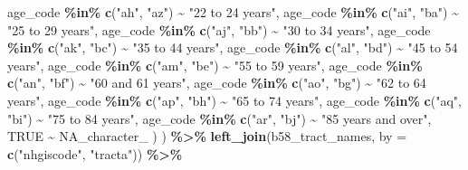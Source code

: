 \documentclass[
]{article}
\newenvironment{Shaded}{\begin{snugshade}}{\end{snugshade}}
\newcommand{\AttributeTok}[1]{\textcolor[rgb]{0.13,0.29,0.53}{#1}}
\newcommand{\ConstantTok}[1]{\textcolor[rgb]{0.56,0.35,0.01}{#1}}
\newcommand{\FunctionTok}[1]{\textcolor[rgb]{0.13,0.29,0.53}{\textbf{#1}}}
\newcommand{\NormalTok}[1]{#1}
\newcommand{\SpecialCharTok}[1]{\textcolor[rgb]{0.81,0.36,0.00}{\textbf{#1}}}
\newcommand{\StringTok}[1]{\textcolor[rgb]{0.31,0.60,0.02}{#1}}
\begin{document}
\begin{Shaded}
\begin{Highlighting}[]
\NormalTok{      age\_code }\SpecialCharTok{\%in\%} \FunctionTok{c}\NormalTok{(}\StringTok{"ah"}\NormalTok{, }\StringTok{"az"}\NormalTok{) }\SpecialCharTok{\textasciitilde{}} \StringTok{"22 to 24 years"}\NormalTok{,}
\NormalTok{      age\_code }\SpecialCharTok{\%in\%} \FunctionTok{c}\NormalTok{(}\StringTok{"ai"}\NormalTok{, }\StringTok{"ba"}\NormalTok{) }\SpecialCharTok{\textasciitilde{}} \StringTok{"25 to 29 years"}\NormalTok{,}
\NormalTok{      age\_code }\SpecialCharTok{\%in\%} \FunctionTok{c}\NormalTok{(}\StringTok{"aj"}\NormalTok{, }\StringTok{"bb"}\NormalTok{) }\SpecialCharTok{\textasciitilde{}} \StringTok{"30 to 34 years"}\NormalTok{,}
\NormalTok{      age\_code }\SpecialCharTok{\%in\%} \FunctionTok{c}\NormalTok{(}\StringTok{"ak"}\NormalTok{, }\StringTok{"bc"}\NormalTok{) }\SpecialCharTok{\textasciitilde{}} \StringTok{"35 to 44 years"}\NormalTok{,}
\NormalTok{      age\_code }\SpecialCharTok{\%in\%} \FunctionTok{c}\NormalTok{(}\StringTok{"al"}\NormalTok{, }\StringTok{"bd"}\NormalTok{) }\SpecialCharTok{\textasciitilde{}} \StringTok{"45 to 54 years"}\NormalTok{,}
\NormalTok{      age\_code }\SpecialCharTok{\%in\%} \FunctionTok{c}\NormalTok{(}\StringTok{"am"}\NormalTok{, }\StringTok{"be"}\NormalTok{) }\SpecialCharTok{\textasciitilde{}} \StringTok{"55 to 59 years"}\NormalTok{,}
\NormalTok{      age\_code }\SpecialCharTok{\%in\%} \FunctionTok{c}\NormalTok{(}\StringTok{"an"}\NormalTok{, }\StringTok{"bf"}\NormalTok{) }\SpecialCharTok{\textasciitilde{}} \StringTok{"60 and 61 years"}\NormalTok{,}
\NormalTok{      age\_code }\SpecialCharTok{\%in\%} \FunctionTok{c}\NormalTok{(}\StringTok{"ao"}\NormalTok{, }\StringTok{"bg"}\NormalTok{) }\SpecialCharTok{\textasciitilde{}} \StringTok{"62 to 64 years"}\NormalTok{,}
\NormalTok{      age\_code }\SpecialCharTok{\%in\%} \FunctionTok{c}\NormalTok{(}\StringTok{"ap"}\NormalTok{, }\StringTok{"bh"}\NormalTok{) }\SpecialCharTok{\textasciitilde{}} \StringTok{"65 to 74 years"}\NormalTok{,}
\NormalTok{      age\_code }\SpecialCharTok{\%in\%} \FunctionTok{c}\NormalTok{(}\StringTok{"aq"}\NormalTok{, }\StringTok{"bi"}\NormalTok{) }\SpecialCharTok{\textasciitilde{}} \StringTok{"75 to 84 years"}\NormalTok{,}
\NormalTok{      age\_code }\SpecialCharTok{\%in\%} \FunctionTok{c}\NormalTok{(}\StringTok{"ar"}\NormalTok{, }\StringTok{"bj"}\NormalTok{) }\SpecialCharTok{\textasciitilde{}} \StringTok{"85 years and over"}\NormalTok{,}
      \ConstantTok{TRUE} \SpecialCharTok{\textasciitilde{}} \ConstantTok{NA\_character\_}
\NormalTok{    )}
\NormalTok{  ) }\SpecialCharTok{\%\textgreater{}\%}
  \FunctionTok{left\_join}\NormalTok{(b58\_tract\_names, }\AttributeTok{by =} \FunctionTok{c}\NormalTok{(}\StringTok{"nhgiscode"}\NormalTok{, }\StringTok{"tracta"}\NormalTok{)) }\SpecialCharTok{\%\textgreater{}\%}

\end{Highlighting}
\end{Shaded}
\end{document}
